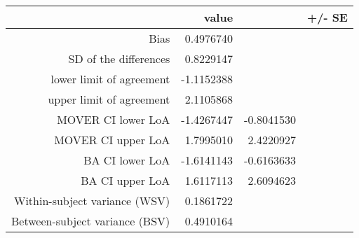 \begin{table}[ht]
\centering
\begin{tabular}{rrrr}
  \hline
 & value &   & +/- SE \\ 
  \hline
Bias & 0.4976740 &  &  \\ 
  SD of the differences & 0.8229147 &  &  \\ 
  lower limit of agreement & -1.1152388 &  &  \\ 
  upper limit of agreement & 2.1105868 &  &  \\ 
  MOVER CI lower LoA & -1.4267447 & -0.8041530 &  \\ 
  MOVER CI upper LoA & 1.7995010 & 2.4220927 &  \\ 
  BA CI lower LoA & -1.6141143 & -0.6163633 &  \\ 
  BA CI upper LoA & 1.6117113 & 2.6094623 &  \\ 
  Within-subject variance (WSV) & 0.1861722 &  &  \\ 
  Between-subject variance (BSV) & 0.4910164 &  &  \\ 
   \hline
\end{tabular}
\end{table}
